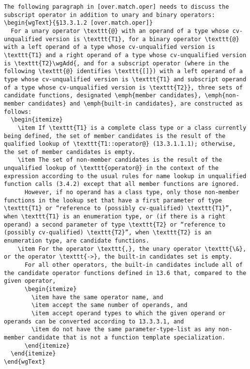 \begin{lstlisting}
The following paragraph in [over.match.oper] needs to discuss the subscript operator in addition to unary and binary operators:
\begin{wgText}{§13.3.1.2 [over.match.oper]}
  For a unary operator \texttt{@} with an operand of a type whose cv-unqualified version is \texttt{T1}, for a binary operator \texttt{@} with a left operand of a type whose cv-unqualified version is \texttt{T1} and a right operand of a type whose cv-unqualified version is \texttt{T2}\wgAdd{, and for a subscript operator (where in the following \texttt{@} identifies \texttt{[]}) with a left operand of a type whose cv-unqualified version is \texttt{T1} and subscript operand of a type whose cv-unqualified version is \texttt{T2}}, three sets of candidate functions, designated \emph{member candidates}, \emph{non-member candidates} and \emph{built-in candidates}, are constructed as follows:
  \begin{itemize}
    \item If \texttt{T1} is a complete class type or a class currently being defined, the set of member candidates is the result of the qualified lookup of \texttt{T1::operator@} (13.3.1.1.1); otherwise, the set of member candidates is empty.
    \item The set of non-member candidates is the result of the unqualified lookup of \texttt{operator@} in the context of the expression according to the usual rules for name lookup in unqualified function calls (3.4.2) except that all member functions are ignored.
      However, if no operand has a class type, only those non-member functions in the lookup set that have a first parameter of type \texttt{T1} or “reference to (possibly cv-qualified) \texttt{T1}”, when \texttt{T1} is an enumeration type, or (if there is a right operand) a second parameter of type \texttt{T2} or “reference to (possibly cv-qualified) \texttt{T2}”, when \texttt{T2} is an enumeration type, are candidate functions.
    \item For the operator \texttt{,}, the unary operator \texttt{\&}, or the operator \texttt{->}, the built-in candidates set is empty.
      For all other operators, the built-in candidates include all of the candidate operator functions defined in 13.6 that, compared to the given operator,
      \begin{itemize}
        \item have the same operator name, and
        \item accept the same number of operands, and
        \item accept operand types to which the given operand or operands can be converted according to 13.3.3.1, and
        \item do not have the same parameter-type-list as any non-member candidate that is not a function template specialization.
      \end{itemize}
  \end{itemize}
\end{wgText}


\end{lstlisting}
